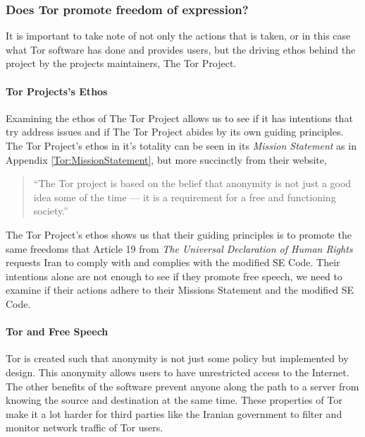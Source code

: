 \documentclass[11pt]{article}
\begin{document}
\begin{multicols}{2}


\subsubsection{Does Tor promote freedom of expression?}

It is important to take note of not only the actions that is taken, or in this
case what Tor software has done and provides users, but the driving ethos behind
the project by the projects maintainers, The Tor Project.

\paragraph{Tor Projects's Ethos}

Examining the ethos of The Tor Project allows us to see if it has 
intentions that try address issues and if The Tor Project abides by its own guiding principles. The Tor
Project's ethos in it's totality can be seen in its \textit{Mission Statement}
as in Appendix \ref{Tor:MissionStatement}, but more succinctly from their website,
\begin{quotation}  
  ``The Tor project is based on the belief that anonymity is not just a good
  idea some of the time — it is a requirement for a free and functioning
  society.''\cite{Tor:Users}
\end{quotation}
The Tor Project's ethos shows us that their guiding principles is to promote
the same freedoms that Article 19 from \textit{The Universal Declaration of Human Rights}
requests Iran to comply with and complies with the modified SE Code. Their
intentions alone are not enough to see if they promote free speech, we need to
examine if their actions adhere to their Missions Statement and the modified SE
Code.


\paragraph{Tor and Free Speech}

Tor is created such that anonymity is not just some policy but implemented by
design. This anonymity allows users to have unrestricted access to the Internet.
The other benefits of the software prevent anyone along the path to a server
from knowing the source and destination at the same time. These properties of
Tor make it a lot harder for third parties like the Iranian government to filter
and monitor network traffic of Tor users.


\end{multicols}
\end{document}

